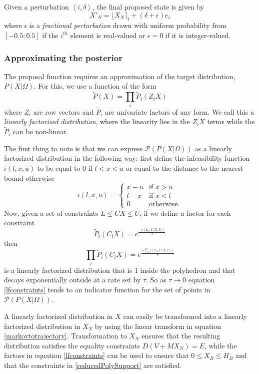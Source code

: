 \documentclass{article}
\begin{document}
Given a perturbation $\left<i,\delta\right>$, the final proposed state is given by
\[
X'_N = \lfloor X_N \rceil_i + (\delta + \epsilon)e_i
\]
where $\epsilon$ is a \textit{fractional perturbation} drawn with uniform probability from $[-0.5:0.5]$ if the $i^{th}$ element is real-valued or $\epsilon = 0$ if it is integer-valued.

\subsubsection{Approximating the posterior}
\label{approximatingThePosterior}
The proposal function requires an approximation of the target distribution, $P(X|\Omega)$. For this, we use a function of the form
\begin{equation}
\tilde{P}(X) = \prod_i \tilde{P}_i(Z_iX)
\end{equation}
where $Z_i$ are row vectors and $\tilde{P}_i$ are univariate factors of any form. We call this a \textit{linearly factorized distribution}, where the linearity lies in the $Z_iX$ terms while the $\tilde{P}_i$ can be non-linear.

The first thing to note is that we can express $\mathcal{P}(P(X|\Omega))$ as a linearly factorized distribution in the following way: first define the infeasibility function $\iota(l,x,u)$ to be equal to 0 if $l < x < u$ or equal to the distance to the nearest bound otherwise
\[
\iota(l,x,u) =
\begin{cases}
x-u & \text{if }x>u\\
l-x & \text{if }x<l\\
0 & \text{otherwise.}
\end{cases}
\]
Now, given a set of constraints $L \le CX \le U$, if we define a factor for each constraint
\begin{equation}
\tilde{P}_i(C_iX) = e^{\frac{-\iota(L_i,C_iX,U_i)}{\tau}}
\end{equation}
then
\begin{equation}
\prod_i \tilde{P}_i(C_iX) = e^{\frac{-\sum_i \iota(L_i,C_iX,U_i)}{\tau}}
\label{lfconstraints}
\end{equation}
is a linearly factorized distribution that is 1 inside the polyhedron and that decays exponentially outside at a rate set by $\tau$. So as $\tau \to 0$ equation \eqref{lfconstraints} tends to an indicator function for the set of points in $\mathcal{P}(P(X|\Omega))$.

A linearly factorized distribution in $X$ can easily be transformed into a linearly factorized distribution in $X_N$ by using the linear transform in equation \eqref{markovtotrajectory}. Transformation to $X_N$ ensures that the resulting distribution satisfies the equality constraints $D(V+MX_N)=E$, while the factors in equation \eqref{lfconstraints} can be used to ensure that $0 \le X_B \le H_B$ and that the constraints in \eqref{reducedPolySupport} are satisfied.
\end{document}
